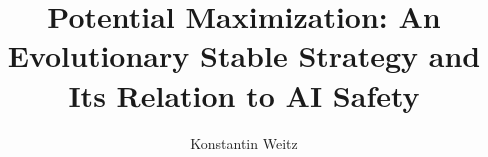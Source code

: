 \documentclass{article}
\title{Potential Maximization: An Evolutionary Stable Strategy and Its Relation to AI Safety}
\author{Konstantin Weitz}
\begin{document}
\maketitle


\begin{abstract}
  
\end{abstract}



%







\appendix

\end{document}
